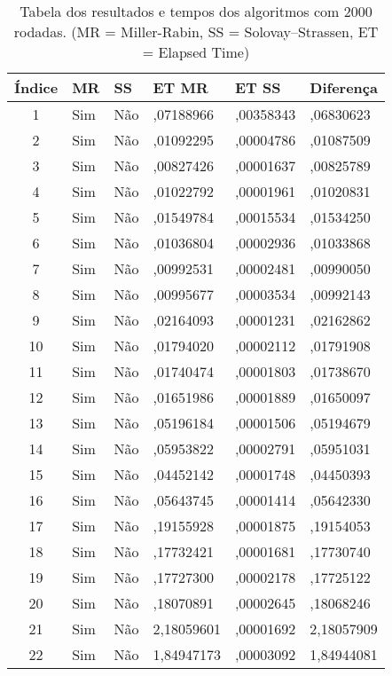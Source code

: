 \documentclass[openany]{ufsctex/ufsctex}
\begin{document}
\begin{longtable}{|c|p{1cm}|p{1cm}|p{2cm}|p{2cm}|p{2cm}|}
 \caption{Tabela dos resultados e tempos dos algoritmos com 2000 rodadas. (MR = Miller-Rabin, SS = Solovay–Strassen, ET = Elapsed Time) }\label{tab:comparacao}\\
 \hline
 Índice & MR & SS & ET MR & ET SS & Diferença \\ \hline
 
1 & Sim & Não & ,07188966 & ,00358343 & ,06830623\\ \hline 
2 & Sim & Não & ,01092295 & ,00004786 & ,01087509\\ \hline 
3 & Sim & Não & ,00827426 & ,00001637 & ,00825789\\ \hline 
4 & Sim & Não & ,01022792 & ,00001961 & ,01020831\\ \hline 
5 & Sim & Não & ,01549784 & ,00015534 & ,01534250\\ \hline 
6 & Sim & Não & ,01036804 & ,00002936 & ,01033868\\ \hline 
7 & Sim & Não & ,00992531 & ,00002481 & ,00990050\\ \hline 
8 & Sim & Não & ,00995677 & ,00003534 & ,00992143\\ \hline 
9 & Sim & Não & ,02164093 & ,00001231 & ,02162862\\ \hline 
10 & Sim & Não & ,01794020 & ,00002112 & ,01791908\\ \hline 
11 & Sim & Não & ,01740474 & ,00001803 & ,01738670\\ \hline 
12 & Sim & Não & ,01651986 & ,00001889 & ,01650097\\ \hline 
13 & Sim & Não & ,05196184 & ,00001506 & ,05194679\\ \hline 
14 & Sim & Não & ,05953822 & ,00002791 & ,05951031\\ \hline 
15 & Sim & Não & ,04452142 & ,00001748 & ,04450393\\ \hline 
16 & Sim & Não & ,05643745 & ,00001414 & ,05642330\\ \hline 
17 & Sim & Não & ,19155928 & ,00001875 & ,19154053\\ \hline 
18 & Sim & Não & ,17732421 & ,00001681 & ,17730740\\ \hline 
19 & Sim & Não & ,17727300 & ,00002178 & ,17725122\\ \hline 
20 & Sim & Não & ,18070891 & ,00002645 & ,18068246\\ \hline 
21 & Sim & Não & 2,18059601 & ,00001692 & 2,18057909\\ \hline 
22 & Sim & Não & 1,84947173 & ,00003092 & 1,84944081\\ \hline 

\end{longtable}
\end{document}
